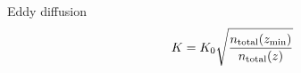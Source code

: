 Eddy diffusion 
\begin{equation}
K = K_0  \sqrt{\frac{n_\text{total}(z_\text{min})}{n_\text{total}(z)}}
\end{equation}
